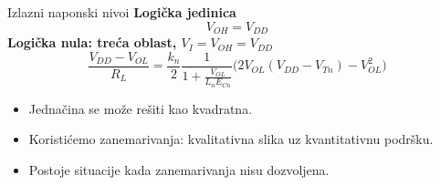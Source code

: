 \begin{frame}[label=09_1-s016]{Izlazni naponski nivoi}\setlength{\parskip}{2pt}\setlength{\abovedisplayskip}{4pt}\setlength{\belowdisplayskip}{4pt}\setlength{\abovedisplayshortskip}{3pt}\setlength{\belowdisplayshortskip}{3pt}
\textbf{Logička jedinica}\[V_{OH}=V_{DD}\]
\textbf{Logička nula: treća oblast, $V_I=V_{OH}=V_{DD}$}\[\frac{V_{DD}-V_{OL}}{R_L}=\frac{k_n}{2}\frac1{1+\frac{V_{OL}}{L_nE_{Cn}}}\bigl(2V_{OL}(V_{DD}-V_{Tn})-V_{OL}^2\bigr)\]
\begin{itemize}
\item Jednačina se može rešiti kao kvadratna.
\item \alert{Koristićemo zanemarivanja}: kvalitativna slika uz kvantitativnu podršku.
\item \alert{Postoje situacije kada zanemarivanja nisu dozvoljena.}
\end{itemize}
\end{frame}
